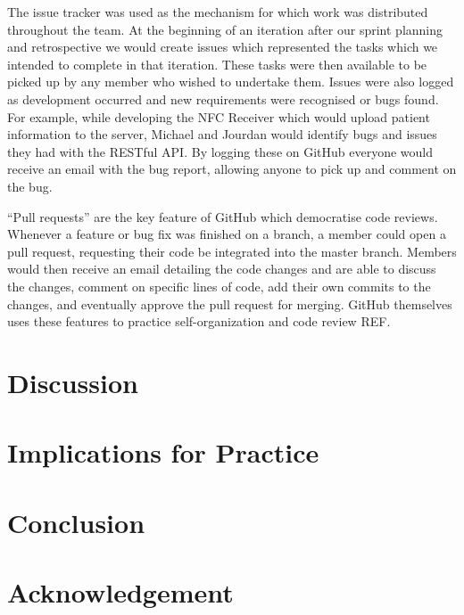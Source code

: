 \documentclass[conference]{IEEEtran}
\begin{document}
The issue tracker was used as the mechanism for which work was distributed
throughout the team. At the beginning of an iteration after our sprint planning
and retrospective we would create issues which represented the tasks which we
intended to complete in that iteration. These tasks were then available to be
picked up by any member who wished to undertake them. Issues were also logged as
development occurred and new requirements were recognised or bugs found. For
example, while developing the NFC Receiver which would upload patient
information to the server, Michael and Jourdan would identify bugs and issues
they had with the RESTful API. By logging these on GitHub everyone would receive
an email with the bug report, allowing anyone to pick up and comment on the bug.

``Pull requests'' are the key feature of GitHub which democratise code reviews.
Whenever a feature or bug fix was finished on a branch, a member could open a
pull request, requesting their code be integrated into the master branch.
Members would then receive an email detailing the code changes and are able to
discuss the changes, comment on specific lines of code, add their own commits to
the changes, and eventually approve the pull request for merging. GitHub
themselves uses these features to practice self-organization and code review
{REF}.


\section{Discussion}


\section{Implications for Practice}


\section{Conclusion}


\section*{Acknowledgement}




\end{document}
